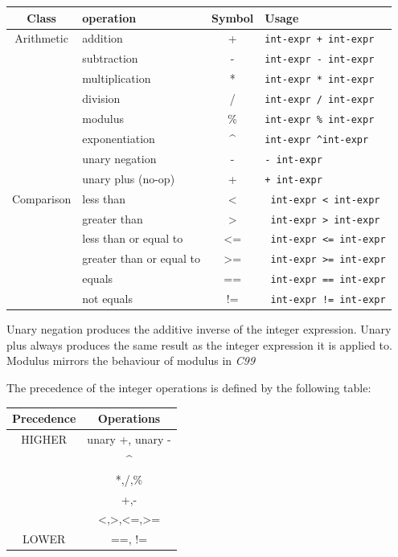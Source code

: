 \documentclass{article}
\begin{document}
		\begin{center}
			\begin{tabular}{|c|l|c|l|}
				\hline
				\textbf{Class} & \textbf{operation} & \textbf{Symbol} & \textbf{Usage} \\
				\hline
				Arithmetic & addition           & +  & \texttt{int-expr + int-expr}  \\
				           & subtraction        & -  &  \texttt{int-expr - int-expr} \\
				           & multiplication     & *  & \texttt{int-expr * int-expr}	 \\
				           & division           & /  & \texttt{int-expr / int-expr}	 \\
				           & modulus            & \% & \texttt{int-expr \% int-expr} \\
				           & exponentiation     & \textasciicircum & \texttt{int-expr \textasciicircum int-expr}	\\
				           & unary negation     & -  & \texttt{- int-expr}	         \\
				           & unary plus (no-op) & +  & \texttt{+ int-expr}           \\
				\hline
				Comparison & less than                & <  & \texttt{ int-expr < int-expr}  \\
				           & greater than             & >  & \texttt{ int-expr > int-expr}  \\
				           & less than or equal to    & <= & \texttt{ int-expr <= int-expr} \\
				           & greater than or equal to & >= & \texttt{ int-expr >= int-expr} \\
				           & equals                   & == & \texttt{ int-expr == int-expr} \\
				           & not equals               & != & \texttt{ int-expr != int-expr} \\
				\hline
			\end{tabular}
		\end{center}

		Unary negation produces the additive inverse of the integer expression. Unary plus always produces the same
		result as the integer expression it is applied to. Modulus mirrors the behaviour of modulus in \textit{C99}

		The precedence of the integer operations is defined by the following table:

		\begin{center}
			\begin{tabular}{|c|c|}
			\hline
			\textbf{Precedence} & \textbf{Operations} \\
			\hline
			HIGHER & unary +, unary - \\
			       & \textasciicircum \\
			       & *,/,\%		        \\
			       & +,-   		        \\
			       & <,>,<=,>=        \\
			LOWER  & ==, !=		        \\
			\hline
			\end{tabular}
		\end{center}
\end{document}
